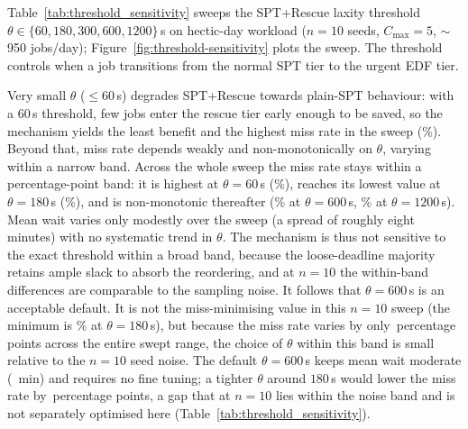 {Table~\ref{tab:threshold_sensitivity} sweeps the SPT+Rescue laxity threshold $\theta \in \{60, 180, 300, 600, 1200\}$\,s on hectic-day workload ($n=10$ seeds, $C_{\max}=5$, $\sim$950 jobs/day); Figure~\ref{fig:threshold-sensitivity} plots the sweep. The threshold controls when a job transitions from the normal SPT tier to the urgent EDF tier.

\begin{table}[htbp]
\centering
\caption[SPT+Rescue threshold sensitivity]{SPT+Rescue threshold sensitivity: avg wait (min) and miss\% on hectic day ($n=10$ seeds, $C_{\max}=5$, 20\% tight 1h / 80\% loose 8h deadlines). Minimum miss rate row is \textbf{bold}.}
\label{tab:threshold_sensitivity}

\end{table}



Very small $\theta$ ($\leq 60$\,s) degrades SPT+Rescue towards plain-SPT behaviour: with a 60\,s threshold, few jobs enter the rescue tier early enough to be saved, so the mechanism yields the least benefit and the highest miss rate in the sweep (\ThrSixtyMiss\%). Beyond that, miss rate depends weakly and non-monotonically on $\theta$, varying within a narrow band. Across the whole sweep the miss rate stays within a \ThrMissSpread\,percentage-point band: it is highest at $\theta=60$\,s (\ThrSixtyMiss\%), reaches its lowest value at $\theta=180$\,s (\ThrOneEightyMiss\%), and is non-monotonic thereafter (\ThrSixHundredMiss\% at $\theta=600$\,s, \ThrTwelveHundredMiss\% at $\theta=1200$\,s). Mean wait varies only modestly over the sweep (a spread of roughly eight minutes) with no systematic trend in $\theta$. The mechanism is thus not sensitive to the exact threshold within a broad band, because the loose-deadline majority retains ample slack to absorb the reordering, and at $n=10$ the within-band differences are comparable to the sampling noise. It follows that $\theta = 600$\,s is an acceptable default. It is not the miss-minimising value in this $n=10$ sweep (the minimum is \ThrOneEightyMiss\% at $\theta=180$\,s), but because the miss rate varies by only \ThrMissSpread\,percentage points across the entire swept range, the choice of $\theta$ within this band is small relative to the $n=10$ seed noise. The default $\theta=600$\,s keeps mean wait moderate (\ThrSixHundredWait~min) and requires no fine tuning; a tighter $\theta$ around $180$\,s would lower the miss rate by \ThrDefaultGap\,percentage points, a gap that at $n=10$ lies within the noise band and is not separately optimised here (Table~\ref{tab:threshold_sensitivity}).


}
